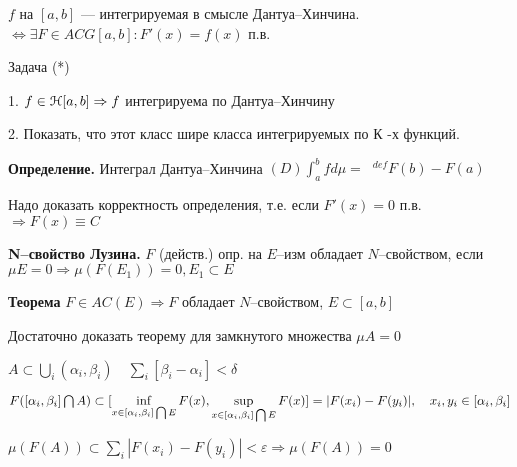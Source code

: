 $f$ на $[a,b]$ --- интегрируемая в смысле
Дантуа--Хинчина.$\Leftrightarrow \exists F \in ACG[a,b] : F'(x) =
f(x)$ п.в.

Задача (*)

1. \quad $f \in \EuScript{H} [a,b] \Rightarrow f$ интегрируема по
 Дантуа--Хинчину

2. \quad Показать, что этот класс шире класса интегрируемых по К
-х функций.

 \textbf{Определение.} \quad Интеграл Дантуа--Хинчина $(D) \int_a^b f d \mu =
\phantom{x}^{\!\!\!\!\!\!\!\!\!\!\!\! def} F(b) - F(a)$

Надо доказать корректность определения, т.е. если  $F'(x) = 0$
п.в.  $\Rightarrow F(x) \equiv C$

\textbf{N--свойство Лузина.} \quad $F$ (действ.) опр. на $E$--изм
обладает  $N$--свойством, если $\mu E = 0 \Rightarrow \mu(F (E_1))
= 0, E_1 \subset E$

\textbf{Теорема} \quad $F \in AC(E) \Rightarrow F$ обладает
$N$--свойством, $E \subset [a,b]$

Достаточно доказать теорему для замкнутого множества $\mu A = 0$

$A \subset \bigcup_i (\alpha_i, \beta_i) \quad \sum_i[\beta_i -
\alpha_i] < \delta$

$F([\alpha_i, \beta_i] \bigcap A) \subset [\inf\limits_{x \in
[\alpha_i, \beta_i] \bigcap E} F(x), \sup\limits_{x \in [\alpha_i,
\beta_i] \bigcap E} F(x)] = |F(x_i) - F(y_i)|, \\ \quad x_i, y_i
\in [\alpha_i, \beta_i]$

$\mu (F(A)) \subset \sum_i |F(x_i) - F(y_i)| < \varepsilon
\Rightarrow \mu(F(A)) = 0$
